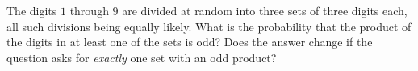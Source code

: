 The digits $1$ through $9$ are divided at random into three sets of three digits each, all such divisions being equally likely. What is the probability that the product of the digits in at least one of the sets is odd? Does the answer change if the question asks for \emph{exactly} one set with an odd product?

